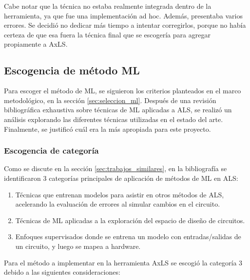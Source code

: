 Cabe notar que la técnica no estaba realmente integrada dentro de la
herramienta, ya que fue una implementación ad hoc. Además, presentaba varios
errores. Se decidió no dedicar más tiempo a intentar corregirlos, porque no
había certeza de que esa fuera la técnica final que se escogería para agregar
propiamente a AxLS.

\subsection{Escogencia de método ML}

Para escoger el método de ML, se siguieron los criterios planteados en el marco
metodológico, en la sección \ref{sec:seleccion_ml}. Después de una revisión
bibliográfica exhaustiva sobre técnicas de ML aplicadas a ALS, se realizó un
análisis explorando las diferentes técnicas utilizadas en el estado del arte.
Finalmente, se justificó cuál era la más apropiada para este proyecto.

\subsubsection{Escogencia de categoría}

Como se discute en la sección \ref{sec:trabajos_similares}, en la bibliografía
se identificaron 3 categorías principales de aplicación de métodos de ML en
ALS:

\begin{enumerate}
  \item Técnicas que entrenan modelos para asistir en otros métodos de ALS,
    acelerando la evaluación de errores al simular cambios en el circuito.
  \item Técnicas de ML aplicadas a la exploración del espacio de diseño de
    circuitos.
  \item Enfoques supervisados donde se entrena un modelo con entradas/salidas
    de un circuito, y luego se mapea a hardware.
\end{enumerate}

Para el método a implementar en la herramienta AxLS se escogió la categoría 3
debido a las siguientes consideraciones:

